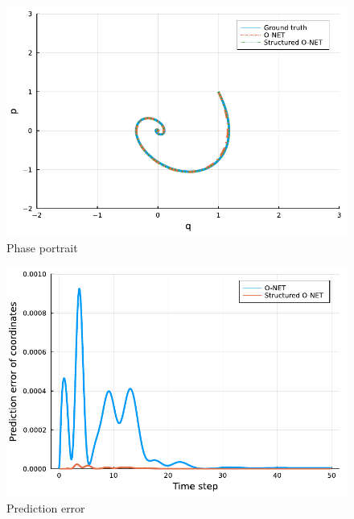 \documentclass[
	parskip, 			   %
	twoside, 			   %
	DIV=14, 			   %
	BCOR=15.0mm, 		   %
	headsepline, 		   %
	open=right, 		   %
	captions=tableheading, %
	bibliography=totoc,    %
	numbers=noenddot       %
]{scrreprt}
\begin{document}
\clearpage
\begin{figure}[h!]
    \centering
    \includegraphics[scale=1]{figures/phase_portrait_O_NET_idho.pdf}
    \caption{Phase portrait}
    \label{fig:phase_portrait_O_NET_idho}
\end{figure}

\begin{figure}[h!]
    \centering
    \includegraphics[scale=1]{figures/prediction_error_structured_O_NET_idho.pdf}
    \caption{Prediction error}
    \label{fig:prediction_error_structured_O_NET_idho}
\end{figure}
\end{document}
